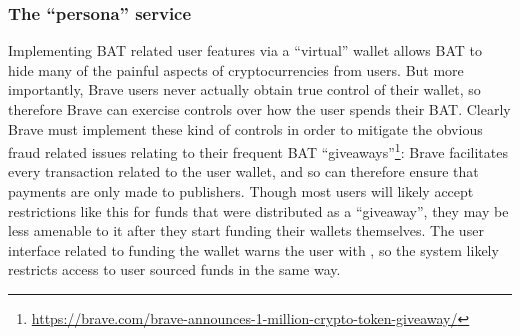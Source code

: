 \documentclass[sigconf]{acmart}
\begin{document}
\subsubsection{The ``persona'' service}
Implementing BAT related user features via
a ``virtual'' wallet
allows BAT to hide many of the painful aspects of
cryptocurrencies from users. But more importantly,
Brave users never actually obtain true control of
their wallet, so therefore Brave can exercise controls
over how the user spends their BAT.
Clearly Brave must implement these kind of controls
in order to mitigate the obvious fraud related issues
relating to their frequent BAT ``giveaways''\footnote{\url{https://brave.com/brave-announces-1-million-crypto-token-giveaway/}}:
Brave facilitates every transaction related to the user wallet,
and so can therefore ensure that payments are only made to
publishers. Though most users will likely accept
restrictions like this for funds that were distributed as a ``giveaway'',
they may be less amenable to it after they start funding their
wallets themselves.
The user interface related to funding the wallet
warns the user with
,
so the system likely
restricts access to user sourced funds in the same way.
\end{document}
